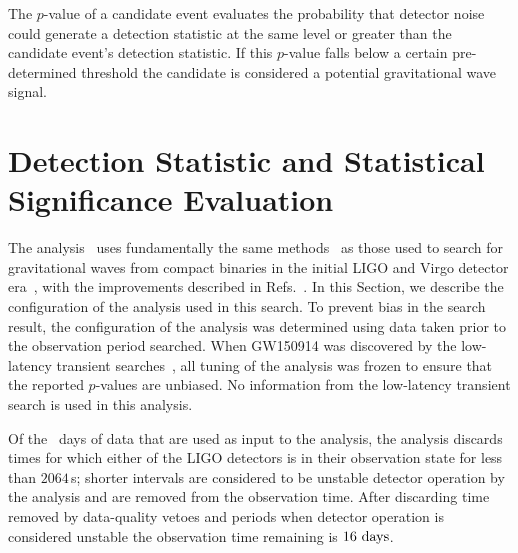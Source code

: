 The $p$-value of a candidate event evaluates the probability that detector
noise could generate a detection statistic at the same level or greater than
the candidate event's detection statistic. If this $p$-value falls below a
certain pre-determined threshold the candidate is considered a potential gravitational
wave signal.

\section{\pycbc{} Detection Statistic and Statistical Significance Evaluation}
\label{s:pycbc}

The \pycbc{} analysis~\cite{Canton:2014ena,Usman:2015kfa,pycbc-github}  uses
fundamentally the same
methods~\cite{Brown:2004pv,Allen:2005fk,Allen:2004gu,Brown:2005zs,Babak:2012zx,Brown:workflow,deelman2005pegasus,deelman2015pegasus,condor-practice,condor-dagman}
as those used to search for gravitational waves from compact binaries in the
initial LIGO and Virgo detector
era~\cite{Abbott:2003pj,Abbott:2005pe,Abbott:2005pf,Abbott:2005kq,Abbott:2007xi,Abbott:2007ai,Abbott:2009tt,Abbott:2009qj,Abadie:2010yba,Colaboration:2011np,Aasi:2012rja,Aasi:2014bqj},
with the improvements described in Refs.~\cite{Canton:2014ena,Usman:2015kfa}.
In this Section, we describe the configuration of the \pycbc{}
analysis used in this search.  To prevent bias in the search result, the
configuration of the analysis was determined using data taken prior to the
observation period searched. When GW150914 was discovered by the low-latency
transient searches~\cite{GW150914-DETECTION}, all tuning of the \pycbc{}
analysis was frozen to ensure that the reported $p$-values are
unbiased. No information from the low-latency transient search is used in this
analysis.

Of the \TotalCoincAfterCATOne~days of data that are used as input to the
analysis, the \pycbc{} analysis discards times for which either of the LIGO
detectors is in their observation state for less than $2064$\,s; shorter
intervals are considered to be unstable detector operation by the \pycbc{}
analysis
and are removed from the observation time. After discarding time removed by
data-quality vetoes and periods when detector operation is considered unstable
the observation time remaining is $16~\mathrm{days}$.

